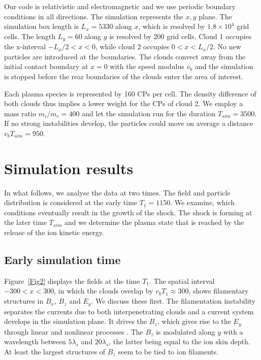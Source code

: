 \documentclass[structabstract]{aa}
\begin{document}
Our code is relativistic and electromagnetic and we use periodic boundary
conditions in all directions. The simulation represents the $x,y$ plane. 
The simulation box length is $L_x = 5330$ along $x$, which is resolved by 
$1.8 \times 10^4$ grid cells. The length $L_y = 60$ along $y$ is resolved 
by 200 grid cells. Cloud 1 occupies the x-interval $-L_x/2 < x<0$, 
while cloud 2 occupies $0<x<L_x/2$. No new particles are introduced at the 
boundaries. The clouds convect away from the initial contact boundary at
$x=0$ with the speed modulus $v_b$ and the simulation is stopped before 
the rear boundaries of the clouds enter the area of interest.

Each plasma species is represented by 160 CPs per cell. The density 
difference of both clouds thus implies a lower weight for the CPs of cloud 2. 
We employ a mass ratio $m_i / m_e = 400$ and let the simulation run for the 
duration $T_{sim} = 3500$. If no strong instabilities develop, the particles 
could move on average a distance $v_b T_{sim}=950$.

\section{Simulation results}

In what follows, we analyse the data at two times. The field and particle
distribution is considered at the early time $T_1 = 1150$. We examine, 
which conditions eventually result in the growth of the shock. The shock 
is forming at the later time $T_{sim}$ and we determine the plasma
state that is reached by the release of the ion kinetic energy.

\subsection{Early simulation time} 

Figure~\ref{Fig2} displays the fields at the time $T_1$. The spatial 
interval $-300 < x < 300$, in which the clouds overlap by $v_b T_1 
\approx 300$, shows filamentary structures in $B_x$, $B_z$ and $E_y$. We 
discuss these first. The filamentation instability separates the currents 
due to both interpenetrating clouds and a current system develops in the 
simulation plane. It drives the $B_z$, which gives rise to the $E_y$ through 
linear \citep{Tzoufras} and nonlinear processes \citep{MagPre}. The $B_z$ 
is modulated along $y$ with a wavelength between $5 \lambda_s$ and $20 
\lambda_s$, the latter being equal to the ion skin depth. At least the 
largest structures of $B_z$ seem to be tied to ion filaments.  
\end{document}
